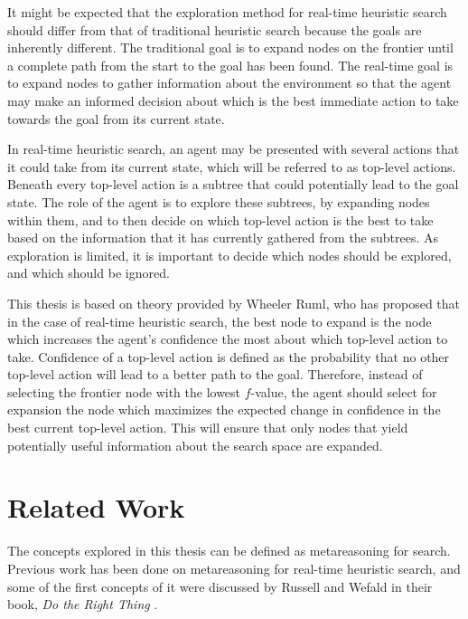 \documentclass[letterpaper, 11 pt, conference]{ieeeconf}  %
\begin{document}
It might be expected that the exploration method for real-time heuristic search should differ from that of traditional heuristic search because the goals are inherently different. The traditional goal is to expand nodes on the frontier until a complete path from the start to the goal has been found. The real-time goal is to expand nodes to gather information about the environment so that the agent may make an informed decision about which is the best immediate action to take towards the goal from its current state.

In real-time heuristic search, an agent may be presented with several actions that it could take from its current state, which will be referred to as top-level actions. Beneath every top-level action is a subtree that could potentially lead to the goal state. The role of the agent is to explore these subtrees, by expanding nodes within them, and to then decide on which top-level action is the best to take based on the information that it has currently gathered from the subtrees. As exploration is limited, it is important to decide which nodes should be explored, and which should be ignored.

This thesis is based on theory provided by Wheeler Ruml, who has proposed that in the case of real-time heuristic search, the best node to expand is the node which increases the agent's confidence the most about which top-level action to take. Confidence of a top-level action is defined as the probability that no other top-level action will lead to a better path to the goal. Therefore, instead of selecting the frontier node with the lowest $f$-value, the agent should select for expansion the node which maximizes the expected change in confidence in the best current top-level action. This will ensure that only nodes that yield potentially useful information about the search space are expanded.

\section{Related Work}

The concepts explored in this thesis can be defined as metareasoning for search. Previous work has been done on metareasoning for real-time heuristic search, and some of the first concepts of it were discussed by Russell and Wefald in their book, \textit{Do the Right Thing} \cite{DBLP:books/daglib/0069195}. 
\end{document}
